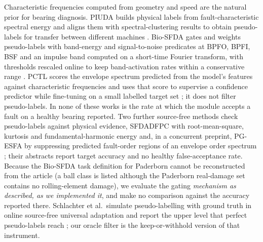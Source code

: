Characteristic frequencies computed from geometry and speed are the natural prior for bearing diagnosis. PIUDA builds
physical labels from fault-characteristic spectral energy and aligns them with spectral-clustering results to obtain pseudo-labels for transfer between different machines
\cite{jia2024piuda}. Bio-SFDA gates and weights pseudo-labels with band-energy and signal-to-noise predicates at BPFO, BPFI,
BSF and an impulse band computed on a short-time Fourier transform, with thresholds rescaled online to keep band-activation rates within a conservative range
\cite{yoon2026biosfda}. PCTL scores the envelope spectrum predicted from the model's features against characteristic
frequencies and uses that score to supervise a confidence predictor while fine-tuning on a small labelled target set
\cite{pctl2026}; it does not filter pseudo-labels. In none of these works is the rate at which the module accepts a fault on
a healthy bearing reported. Two further source-free methods check pseudo-labels against physical evidence, SFDADFPC with root-mean-square, kurtosis and fundamental-harmonic energy \cite{hui2026sfdadfpc} and, in a concurrent preprint, PG-ESFA by suppressing predicted fault-order regions of an envelope order spectrum \cite{yue2026pgesfa}; their abstracts report target accuracy and no healthy false-acceptance rate. Because the Bio-SFDA task definition for Paderborn cannot be reconstructed from the article (a
ball class is listed although the Paderborn real-damage set contains no rolling-element damage), we evaluate the gating
\emph{mechanism as described, as we implemented it}, and make no comparison against the accuracy reported there.
Schlachter et al.\ simulate pseudo-labelling with ground truth in online source-free universal adaptation and report the upper
level that perfect pseudo-labels reach \cite{schlachter2025}; our oracle filter is the keep-or-withhold version of that
instrument.

